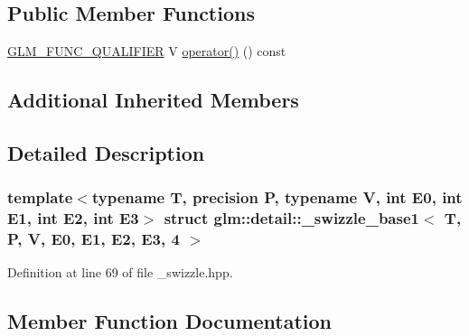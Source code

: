 \subsection*{Public Member Functions}
\begin{DoxyCompactItemize}
\item 
\hyperlink{setup_8hpp_a33fdea6f91c5f834105f7415e2a64407}{G\+L\+M\+\_\+\+F\+U\+N\+C\+\_\+\+Q\+U\+A\+L\+I\+F\+I\+ER} V \hyperlink{structglm_1_1detail_1_1__swizzle__base1_3_01_t_00_01_p_00_01_v_00_01_e0_00_01_e1_00_01_e2_00_01_e3_00_014_01_4_a11729662122da04f12998b6a8edea8b4}{operator()} () const
\end{DoxyCompactItemize}
\subsection*{Additional Inherited Members}


\subsection{Detailed Description}
\subsubsection*{template$<$typename T, precision P, typename V, int E0, int E1, int E2, int E3$>$\newline
struct glm\+::detail\+::\+\_\+swizzle\+\_\+base1$<$ T, P, V, E0, E1, E2, E3, 4 $>$}



Definition at line 69 of file \+\_\+swizzle.\+hpp.



\subsection{Member Function Documentation}
\mbox{\label{structglm_1_1detail_1_1__swizzle__base1_3_01_t_00_01_p_00_01_v_00_01_e0_00_01_e1_00_01_e2_00_01_e3_00_014_01_4_a11729662122da04f12998b6a8edea8b4}} 
